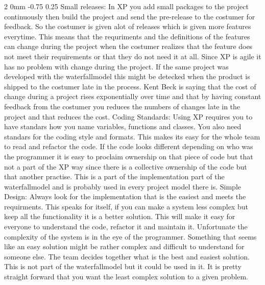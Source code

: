 \documentclass[a4paper,11pt]{article}
\makeatletter
\renewcommand{\subsection}{\@startsection
   {subsection}%
   {2}%
   {0mm}%
   {-0.75\baselineskip}%
   {0.25\baselineskip}%
   {\rmfamily\normalfont\slshape\normalsize}}%
\makeatother
\begin{document}
\subsection{}
Small releases:\newline
In XP you add small packages to the project continuously then build the project and send the pre-release to the costumer for feedback. So the costumer is given alot of releases which is given more features everytime. This means that the requriments and the definitions of the features can change during the project when the costumer realizes that the feature does not meet their requirements or that they do not need it at all. Since XP is agile it has no problem with change during the project. If the same project was developed with the waterfallmodel this might be detecked when the product is shipped to the costumer late in the process. Kent Beck is saying that the cost of change during a project rises exponentially over time and that by having constant feedback from the costumer you reduces the numbers of changes late in the project and that reduces the cost.\cite{KENT} \newline
\newline
Coding Standards:\newline
Using XP requires you to have standars how you name variables, functions and classes. You also need standars for the coding style and formats. This makes its easy for the whole team to read and refactor the code. If the code looks different depending on who was the programmer it is easy to proclaim ownership on that piece of code but that not a part of the XP way since there is a collective ownership of the code but that another practise. This is a part of the implementation part of the waterfallmodel and is probably used in every project model there is.\newline
\newline
Simple Design: \newline
Always look for the implementation that is the easiest and meets the requirments. This speaks for itself, if you can make a system less complex but keep all the functionality it is a better solution. This will make it easy for everyone to understand the code, refactor it and maintain it. Unfortunate the complexity of the system is in the eye of the programmer. Something that seems like an easy solution might be rather complex and difficult to understand for someone else. The team decides together what is the best and easiest solution. This is not part of the waterfallmodel but it could be used in it. It is pretty straight forward that you want the least complex solution to a given problem.\newline 
\end{document}
